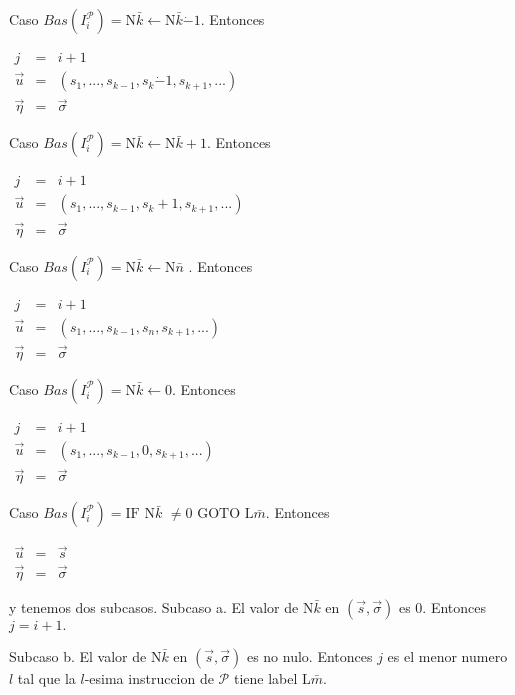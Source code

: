 Caso \(Bas(I_{i}^{\mathcal{P}})=\mathrm{N}\bar{k}\leftarrow \mathrm{N}\bar{k} \dot{-}1.\) Entonces

\(\displaystyle \begin{array}{rcl} j & =& i+1 \\ \vec{u} & =& (s_{1},...,s_{k-1},s_{k}\dot{-}1,s_{k+1},...) \\ \vec{\eta} & =& \vec{\sigma} \end{array} \)

Caso \(Bas(I_{i}^{\mathcal{P}})=\mathrm{N}\bar{k}\leftarrow \mathrm{N}\bar{k} +1.\) Entonces

\(\displaystyle \begin{array}{rcl} j & =& i+1 \\ \vec{u} & =& (s_{1},...,s_{k-1},s_{k}+1,s_{k+1},...) \\ \vec{\eta} & =& \vec{\sigma} \end{array} \)

Caso \(Bas(I_{i}^{\mathcal{P}})=\mathrm{N}\bar{k}\leftarrow \mathrm{N}\bar{n}\) . Entonces

\(\displaystyle \begin{array}{rcl} j & =& i+1 \\ \vec{u} & =& (s_{1},...,s_{k-1},s_{n},s_{k+1},...) \\ \vec{\eta} & =& \vec{\sigma} \end{array} \)

Caso \(Bas(I_{i}^{\mathcal{P}})=\mathrm{N}\bar{k}\leftarrow 0.\) Entonces

\(\displaystyle \begin{array}{rcl} j & =& i+1 \\ \vec{u} & =& (s_{1},...,s_{k-1},0,s_{k+1},...) \\ \vec{\eta} & =& \vec{\sigma} \end{array} \)

Caso \(Bas(I_{i}^{\mathcal{P}})=\mathrm{IF}\) \(\mathrm{N}\bar{k}\) \(\neq 0\) \( \mathrm{GOTO}\) \(\mathrm{L}\bar{m}.\) Entonces

\(\displaystyle \begin{array}{rcl} \vec{u} & =& \vec{s} \\ \vec{\eta} & =& \vec{\sigma} \end{array} \)

y tenemos dos subcasos.
Subcaso a. El valor de \(\mathrm{N}\bar{k}\) en \((\vec{s},\vec{\sigma})\) es 0. Entonces \(j=i+1.\)

Subcaso b. El valor de \(\mathrm{N}\bar{k}\) en \((\vec{s},\vec{\sigma})\) es no nulo. Entonces \(j\) es el menor numero \(l\) tal que la \(l\)-esima instruccion de \(\mathcal{P}\) tiene label \(\mathrm{L}\bar{m}\).

